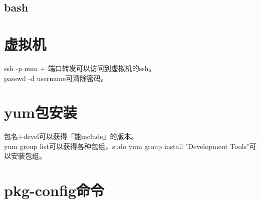 \documentclass{ctexart}
\begin{document}
\subsection{bash}

\section{虚拟机}
\noindent ssh -p num + 端口转发可以访问到虚拟机的ssh。\\
\noindent passwd -d username可清除密码。\\
\section{yum包安装}
\noindent 包名+devel可以获得「能include」的版本。\\
\noindent yum group list可以获得各种包组，sudo yum group install "Development Tools"可以安装包组。
\section{pkg-config命令}
\end{document}

